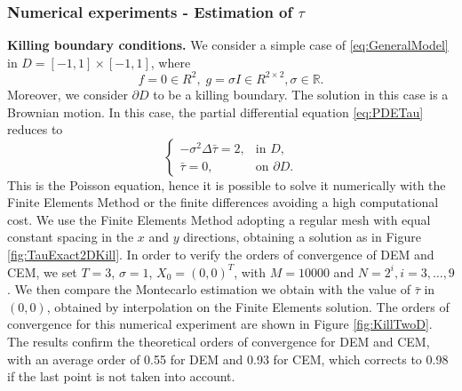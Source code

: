 \subsubsection{Numerical experiments - Estimation of $\tau$}\label{sec:ExpTau2D}

\textbf{Killing boundary conditions.} We consider a simple case of \eqref{eq:GeneralModel} in $D = [-1,1] \times [-1,1]$, where
\begin{equation*}
	f = 0 \in R^2, \; g = \sigma I\in R^{2\times 2}, \sigma \in \mathbb{R}.
\end{equation*}
Moreover, we consider $\partial D$ to be a killing boundary. The solution in this case is a Brownian motion. In this case, the partial differential equation \eqref{eq:PDETau} reduces to
\begin{equation}\label{eq:PDETau2DKilling}
\begin{cases}
	- \sigma^2 \Delta \bar \tau = 2, & \text{in } D, \\
	\bar \tau = 0, & \text{on } \partial D.
\end{cases}
\end{equation}
This is the Poisson equation, hence it is possible to solve it numerically with the Finite Elements Method or the finite differences avoiding a high computational cost. We use the Finite Elements Method adopting a regular mesh with equal constant spacing in the $x$ and $y$ directions, obtaining a solution as in Figure \ref{fig:TauExact2DKill}. In order to verify the orders of convergence of DEM and CEM, we set $T = 3$, $\sigma = 1$, $X_0 = (0,0)^T$, with $M = 10000$ and $N = 2^i,i=3,\dots,9$. We then compare the Montecarlo estimation we obtain with the value of $\bar\tau$ in $(0,0)$, obtained by interpolation on the Finite Elements solution. The orders of convergence for this numerical experiment are shown in Figure \ref{fig:KillTwoD}. The results confirm the theoretical orders of convergence for DEM and CEM, with an average order of 0.55 for DEM and 0.93 for CEM, which corrects to 0.98 if the last point is not taken into account.

